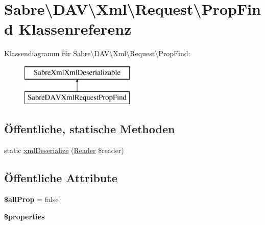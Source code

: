 \hypertarget{class_sabre_1_1_d_a_v_1_1_xml_1_1_request_1_1_prop_find}{}\section{Sabre\textbackslash{}D\+AV\textbackslash{}Xml\textbackslash{}Request\textbackslash{}Prop\+Find Klassenreferenz}
\label{class_sabre_1_1_d_a_v_1_1_xml_1_1_request_1_1_prop_find}
Klassendiagramm für Sabre\textbackslash{}D\+AV\textbackslash{}Xml\textbackslash{}Request\textbackslash{}Prop\+Find\+:\begin{figure}[H]
\begin{center}
\leavevmode
\includegraphics[height=2.000000cm]{class_sabre_1_1_d_a_v_1_1_xml_1_1_request_1_1_prop_find}
\end{center}
\end{figure}
\subsection*{Öffentliche, statische Methoden}
\begin{DoxyCompactItemize}
\item 
static \mbox{\hyperlink{class_sabre_1_1_d_a_v_1_1_xml_1_1_request_1_1_prop_find_aeb20071602160c3cd1988077a0ad09f0}{xml\+Deserialize}} (\mbox{\hyperlink{class_sabre_1_1_xml_1_1_reader}{Reader}} \$reader)
\end{DoxyCompactItemize}
\subsection*{Öffentliche Attribute}
\begin{DoxyCompactItemize}
\item 
\mbox{\label{class_sabre_1_1_d_a_v_1_1_xml_1_1_request_1_1_prop_find_a16249c36e8d48bacc83f29075735159d}} 
{\bfseries \$all\+Prop} = false
\item 
\mbox{\label{class_sabre_1_1_d_a_v_1_1_xml_1_1_request_1_1_prop_find_abf26d11d57d09813d5b3ea6120366d7b}} 
{\bfseries \$properties}
\end{DoxyCompactItemize}


